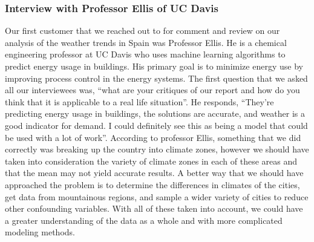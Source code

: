 \documentclass[10pt]{article}
\begin{document}
\subsubsection*{Interview with Professor Ellis of UC Davis}
Our first customer that we reached out to for comment and review on our analysis of the weather trends in Spain was Professor Ellis. He is a chemical engineering professor at UC Davis who uses machine learning algorithms to predict energy usage in buildings. His primary goal is to minimize energy use by improving process control in the energy systems. The first question that we asked all our interviewees was, “what are your critiques of our report and how do you think that it is applicable to a real life situation”. He responds, “They’re predicting energy usage in buildings, the solutions are accurate, and weather is a good indicator for demand. I could definitely see this as being a model that could be used with a lot of work”. According to professor Ellis, something that we did correctly was breaking up the country into climate zones, however we should have taken into consideration the variety of climate zones in each of these areas and that the mean may not yield accurate results. A better way that we should have approached the problem is to determine the differences in climates of the cities, get data from mountainous regions, and sample a wider variety of cities to reduce other confounding variables. With all of these taken into account, we could have a greater understanding of the data as a whole and with more complicated modeling methods.
\end{document}
